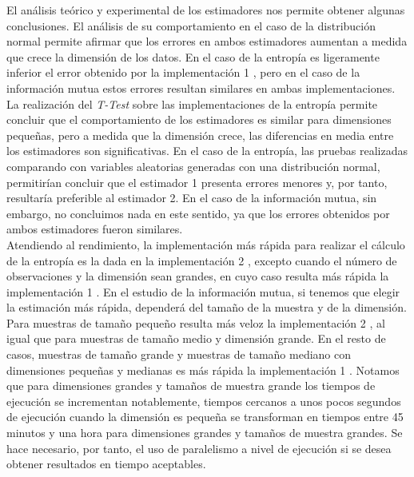 \documentclass[12pt,a4paper]{report} %
\theoremstyle{definition}
\begin{document}
El análisis teórico y experimental de los estimadores nos permite obtener algunas conclusiones. El análisis de su comportamiento en el caso de la distribución normal permite afirmar que los errores en ambos estimadores aumentan a medida que crece la dimensión de los datos. En el caso de la entropía es ligeramente inferior el error obtenido por la implementación 1 \cite{estimating}, pero en el caso de la información mutua estos errores resultan similares en ambas implementaciones.\\

La realización del \textit{T-Test} sobre las implementaciones de la entropía permite concluir que el comportamiento de los estimadores es similar para dimensiones pequeñas, pero a medida que la dimensión crece, las diferencias en media entre los estimadores son significativas. En el caso de la entropía, las pruebas realizadas comparando con variables aleatorias generadas con una distribución normal, permitirían concluir que el estimador 1 \cite{estimating} presenta errores menores y, por tanto, resultaría preferible al estimador 2\cite{npeet}. En el caso de la información mutua, sin embargo, no concluimos nada en este sentido, ya que los errores obtenidos por ambos estimadores fueron similares.\\

Atendiendo al rendimiento, la implementación más rápida para realizar el cálculo de la entropía es la dada en la implementación 2 \cite{npeet}, excepto cuando el número de observaciones y la dimensión sean grandes, en cuyo caso resulta más rápida la implementación 1 \cite{estimating}. En el estudio de la información mutua, si tenemos que elegir la estimación más rápida, dependerá del tamaño de la muestra y de la dimensión. Para muestras de tamaño pequeño resulta más veloz la implementación 2 \cite{npeet}, al igual que para muestras de tamaño medio y dimensión grande. En el resto de casos, muestras de tamaño grande y muestras de tamaño mediano con dimensiones pequeñas y medianas es más rápida la implementación 1 \cite{estimating}. Notamos que para dimensiones grandes y tamaños de muestra grande los tiempos de ejecución se incrementan notablemente, tiempos cercanos a unos pocos segundos de ejecución cuando la dimensión es pequeña se transforman en tiempos entre 45 minutos y una hora para dimensiones grandes y tamaños de muestra grandes. Se hace necesario, por tanto, el uso de paralelismo a nivel de ejecución si se desea obtener resultados en tiempo aceptables.\\
\end{document}
